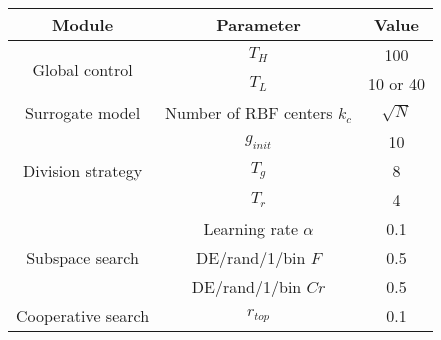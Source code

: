 \begin{tabular}{|c|c|c|}
\hline
Module                                  & Parameter                   & Value                         \\ \hline
\multirow{2}{*}{Global control}         & $T_H$                    & 100                           \\ \cline{2-3} 
                                        & $T_L$                    & 10 or 40                      \\ \hline
\multirow{1}{*}{Surrogate model}         & Number of RBF centers $k_c$ & $\sqrt{N}$                    \\ \hline
\multirow{3}{*}{Division strategy}      & $g_{init}$                  & 10                            \\ \cline{2-3} 
                                        & $T_g$                       & 8                             \\ \cline{2-3} 
                                        & $T_r$                       & 4                             \\ \hline
\multirow{3}{*}{Subspace search}     %
                                        & Learning rate $\alpha$                    & 0.1                           \\ \cline{2-3} 
                                        & DE/rand/1/bin $F$           & 0.5                           \\ \cline{2-3} 
                                        & DE/rand/1/bin $Cr$           & 0.5                           \\ \hline
\multirow{1}{*}{Cooperative search} & $r_{top}$                   & 0.1                           \\ \hline 
\end{tabular}
